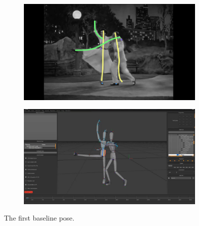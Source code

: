 \begin{figure}[H]
	\centering
        \begin{subfigure}[b!]{0.45\textwidth}
        	\centering
                \includegraphics[width=\linewidth]{img/keyframe_case_9_(4)}
        \end{subfigure}
        \quad
        \begin{subfigure}[b!]{0.45\textwidth}
        	\centering
                \includegraphics[width=\linewidth]{img/baselinepose1}
        \end{subfigure}%
        \caption{The first baseline pose.}
	\label{fig:bpose1}
\end{figure}

